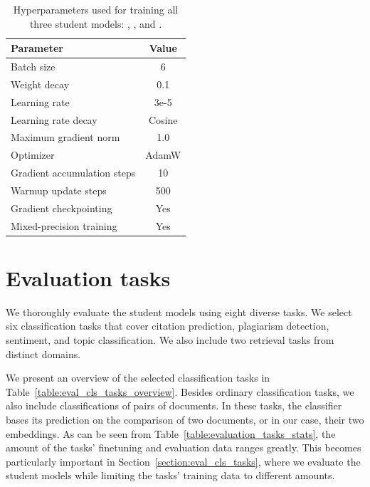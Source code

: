 \begin{table}
  \centering
  \footnotesize

  \begin{tabular}{l c}
    \toprule
    Parameter & Value \\
    \midrule
    Batch size & 6 \\
    Weight decay & 0.1 \\
    Learning rate & 3e-5 \\
    Learning rate decay & Cosine \\
    Maximum gradient norm & 1.0 \\
    Optimizer & AdamW \\
    Gradient accumulation steps & 10 \\
    Warmup update steps & 500\\
    Gradient checkpointing & Yes \\
    Mixed-precision training & Yes \\
    \bottomrule
  \end{tabular}

  \caption{Hyperparameters used for training all three student models:
  {\CosineStudent}, {\MSEStudent}, and {\OnlyMSEStudent}.}

  \label{table:final_student_train_params}

\end{table}

\section{Evaluation tasks}

We thoroughly evaluate the student models using eight diverse tasks. We
select six classification tasks that cover citation prediction, plagiarism
detection, sentiment, and topic classification. We also include two retrieval
tasks from distinct domains.

We present an overview of the selected classification tasks in
Table~\ref{table:eval_cls_tasks_overview}. Besides ordinary classification
tasks, we also include classifications of pairs of documents. In these tasks,
the classifier bases its prediction on the comparison of two documents, or in
our case,  their two embeddings. As can be seen from
Table~\ref{table:evaluation_tasks_stats}, the amount of the tasks' finetuning
and evaluation data ranges greatly. This becomes particularly important in
Section~\ref{section:eval_cls_tasks}, where we evaluate the student models
while limiting the tasks' training data to different amounts.

